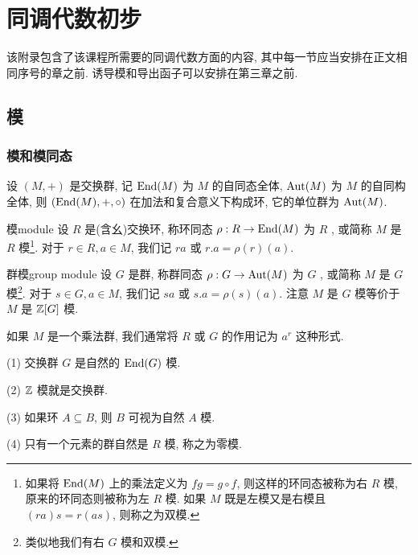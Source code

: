 
\chapter{同调代数初步}\label{chap:homological_algebra}




该附录包含了该课程所需要的同调代数方面的内容, 其中每一节应当安排在正文相同序号的章之前. 诱导模和导出函子可以安排在第三章之前.

\section{模}\label{sec:modules}
\subsection{模和模同态}\label{subsec:modules_and_homomorphisms}
设 $(M,+)$ 是交换群, 记 ${\mathrm{End}}(M)$ 为 $M$ 的自同态全体, ${\mathrm{Aut}}(M)$ 为 $M$ 的自同构全体, 则 $({\mathrm{End}}(M),+,\circ)$ 在加法和复合意义下构成环, 它的单位群为 ${\mathrm{Aut}}(M)$.

\begin{definition}{模}{module}
设 $R$ 是(含幺)交换环, 称环同态 $\rho:R\to {\mathrm{End}}(M)$ 为 $R$ , 或简称 $M$ 是 $R$ 模\footnote{如果将 ${\mathrm{End}}(M)$ 上的乘法定义为 $fg=g\circ f$, 则这样的环同态被称为右 $R$ 模, 原来的环同态则被称为左 $R$ 模. 如果 $M$ 既是左模又是右模且 $(ra)s=r(as)$, 则称之为双模.}. 对于 $r\in R, a\in M$, 我们记 $ra$ 或 $r.a=\rho(r)(a)$.
\end{definition}

\begin{definition}{群模}{group module}
设 $G$ 是群, 称群同态 $\rho:G\to {\mathrm{Aut}}(M)$ 为 $G$ , 或简称 $M$ 是 $G$ 模\footnote{类似地我们有右 $G$ 模和双模.}. 对于 $s\in G, a\in M$, 我们记 $sa$ 或 $s.a=\rho(s)(a)$. 注意 $M$ 是 $G$ 模等价于 $M$ 是 ${\mathbb{Z}}[G]$ 模.
\end{definition}

\begin{remark}
如果 $M$ 是一个乘法群, 我们通常将 $R$ 或 $G$ 的作用记为 $a^r$ 这种形式. 
\end{remark}

\begin{example}
(1) 交换群 $G$ 是自然的 ${\mathrm{End}}(G)$ 模.

(2) ${\mathbb{Z}}$ 模就是交换群.

(3) 如果环 $A\subseteq B$, 则 $B$ 可视为自然 $A$ 模.

(4) 只有一个元素的群自然是 $R$ 模, 称之为零模.
\end{example}

